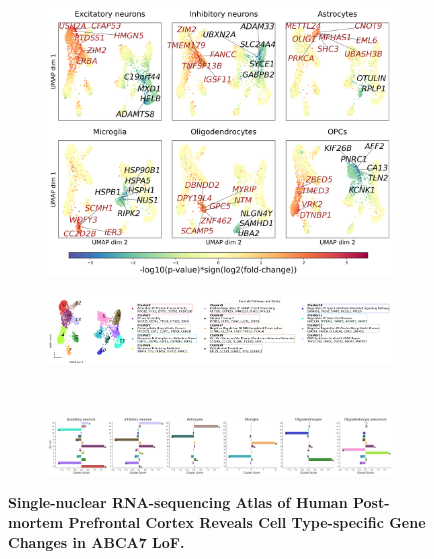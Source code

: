 \begin{figure}[H]
\begin{subfigure}[t]{.5\textwidth}
\begin{subfigure}[t]{.5\textwidth}
        \end{subfigure}
    \\[-3ex] 
    \end{subfigure}
    \begin{subfigure}[t]{0.5\textwidth}
        \caption{}
        \includegraphics[width=\textwidth]{./main_plots/umap_projection_top_genes.png}        
    \end{subfigure}
    \begin{subfigure}[t]{\textwidth}
        \caption{}
        \includegraphics[width=\textwidth]{./main_plots/clusters_umap.png}        
    \end{subfigure}
    \\[-2ex] 
    \begin{subfigure}[t]{\textwidth}
        \caption{}
        \includegraphics[width=\textwidth]{./main_plots/clusters_bars.png}        
    \end{subfigure}
    \caption{
        \textbf{Single-nuclear RNA-sequencing Atlas of Human Post-mortem Prefrontal Cortex Reveals Cell Type-specific Gene Changes in ABCA7 LoF.}\\
        }
    \label{fig:main_atlas}
\end{figure}
